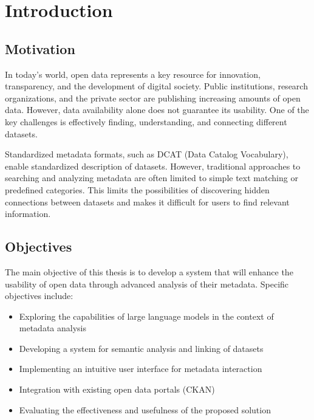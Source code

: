 
\chapter*{Introduction}

\section*{Motivation}
In today's world, open data represents a key resource for innovation, transparency, and 
the development of digital society. Public institutions, research organizations, and the 
private sector are publishing increasing amounts of open data. However, data availability 
alone does not guarantee its usability. One of the key challenges is effectively finding, 
understanding, and connecting different datasets.

Standardized metadata formats, such as DCAT (Data Catalog Vocabulary), enable standardized 
description of datasets. However, traditional approaches to searching and analyzing metadata 
are often limited to simple text matching or predefined categories. This limits the 
possibilities of discovering hidden connections between datasets and makes it difficult 
for users to find relevant information.

\section*{Objectives}
The main objective of this thesis is to develop a system that will enhance the usability 
of open data through advanced analysis of their metadata. Specific objectives include:

\begin{itemize}
    \item Exploring the capabilities of large language models in the context of metadata analysis
    \item Developing a system for semantic analysis and linking of datasets
    \item Implementing an intuitive user interface for metadata interaction
    \item Integration with existing open data portals (CKAN)
    \item Evaluating the effectiveness and usefulness of the proposed solution
\end{itemize}

